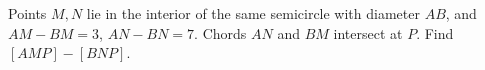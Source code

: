 Points $M,N$ lie in the interior of the same semicircle with diameter $AB$, and $AM-BM=3$, $AN-BN=7$. Chords $AN$ and $BM$ intersect at $P$. Find $[AMP]-[BNP]$.
